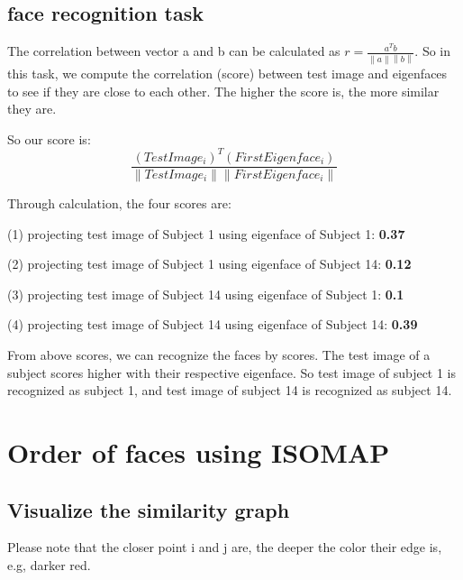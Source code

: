 \documentclass{article}
\begin{document}
\subsection{face recognition task}
The correlation between vector a and b can be calculated as $r =\frac{a^T b}{\left \| a\right \| \left \| b \right \|}$. So in this task, we compute the correlation (score) between test image and eigenfaces to see if they are close to each other. The higher the score is, the more similar they are. 

So our score is:
$$\frac{(TestImage_i)^T(FirstEigenface_i)}{\parallel TestImage_i \parallel \parallel FirstEigenface_i\parallel }$$

\medskip
Through calculation, the four scores are:

(1) projecting test image of Subject 1 using eigenface of Subject 1: \textbf{0.37}

(2) projecting test image of Subject 1 using eigenface of Subject 14: \textbf{0.12}

(3) projecting test image of Subject 14 using eigenface of Subject 1: \textbf{0.1}

(4) projecting test image of Subject 14 using eigenface of Subject 14: \textbf{0.39}

\medskip
From above scores, we can recognize the faces by scores. The test image of a subject scores higher with their respective eigenface. So test image of subject 1 is recognized as subject 1, and test image of subject 14 is recognized as subject 14.

\section{Order of faces using ISOMAP}
\subsection{Visualize the similarity graph}
Please note that the closer point i and j are, the deeper the color their edge is, e.g, darker red.
\end{document}
